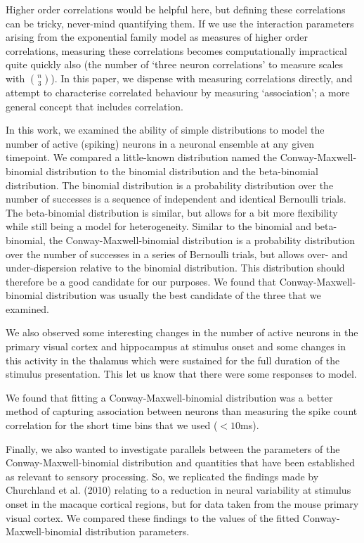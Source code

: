 Higher order correlations would be helpful here, but defining these correlations can be tricky, never-mind quantifying them. If we use the interaction parameters arising from the exponential family model as measures of higher order correlations, measuring these correlations becomes computationally impractical quite quickly also (the number of `three neuron correlations' to measure scales with $\binom{n}{3}$). In this paper, we dispense with measuring correlations directly, and attempt to characterise correlated behaviour by measuring `association'; a more general concept that includes correlation.

In this work, we examined the ability of simple distributions to model the number of active (spiking) neurons in a neuronal ensemble at any given timepoint. We compared a little-known distribution named the Conway-Maxwell-binomial distribution to the binomial distribution and the beta-binomial distribution. The binomial distribution is a probability distribution over the number of successes is a sequence of independent and identical Bernoulli trials. The beta-binomial distribution is similar, but allows for a bit more flexibility while still being a model for heterogeneity. Similar to the binomial and beta-binomial, the Conway-Maxwell-binomial distribution is a probability distribution over the number of successes in a series of Bernoulli trials, but allows over- and under-dispersion relative to the binomial distribution. This distribution should therefore be a good candidate for our purposes. We found that Conway-Maxwell-binomial distribution was usually the best candidate of the three that we examined.

We also observed some interesting changes in the number of active neurons in the primary visual cortex and hippocampus at stimulus onset and some changes in this activity in the thalamus which were sustained for the full duration of the stimulus presentation. This let us know that there were some responses to model.

We found that fitting a Conway-Maxwell-binomial distribution was a better method of capturing association between neurons than measuring the spike count correlation for the short time bins that we used ($<10$ms).

Finally, we also wanted to investigate parallels between the parameters of the Conway-Maxwell-binomial distribution and quantities that have been established as relevant to sensory processing. So, we replicated the findings made by Churchland et al. (2010) relating to a reduction in neural variability at stimulus onset in the macaque cortical regions, but for data taken from the mouse primary visual cortex. We compared these findings to the values of the fitted Conway-Maxwell-binomial distribution parameters.

